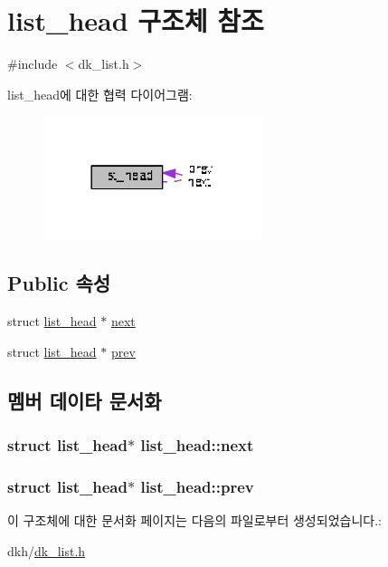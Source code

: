 \hypertarget{structlist__head}{\section{list\+\_\+head 구조체 참조}
\label{structlist__head}
}


{\ttfamily \#include $<$dk\+\_\+list.\+h$>$}



list\+\_\+head에 대한 협력 다이어그램\+:
\nopagebreak
\begin{figure}[H]
\begin{center}
\leavevmode
\includegraphics[width=182pt]{structlist__head__coll__graph}
\end{center}
\end{figure}
\subsection*{Public 속성}
\begin{DoxyCompactItemize}
\item 
struct \hyperlink{structlist__head}{list\+\_\+head} $\ast$ \hyperlink{structlist__head_ac3b0ff0dfb978a0cfbdad6b9d19cdcfe}{next}
\item 
struct \hyperlink{structlist__head}{list\+\_\+head} $\ast$ \hyperlink{structlist__head_ae4298f7975979e5f6bb406c40c1fa443}{prev}
\end{DoxyCompactItemize}


\subsection{멤버 데이타 문서화}
\hypertarget{structlist__head_ac3b0ff0dfb978a0cfbdad6b9d19cdcfe}{
\subsubsection[{next}]{\setlength{\rightskip}{0pt plus 5cm}struct {\bf list\+\_\+head}$\ast$ list\+\_\+head\+::next}}\label{structlist__head_ac3b0ff0dfb978a0cfbdad6b9d19cdcfe}
\hypertarget{structlist__head_ae4298f7975979e5f6bb406c40c1fa443}{
\subsubsection[{prev}]{\setlength{\rightskip}{0pt plus 5cm}struct {\bf list\+\_\+head}$\ast$ list\+\_\+head\+::prev}}\label{structlist__head_ae4298f7975979e5f6bb406c40c1fa443}


이 구조체에 대한 문서화 페이지는 다음의 파일로부터 생성되었습니다.\+:\begin{DoxyCompactItemize}
\item 
dkh/\hyperlink{dk__list_8h}{dk\+\_\+list.\+h}\end{DoxyCompactItemize}
